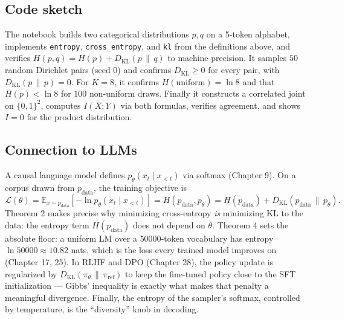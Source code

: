 \subsection*{Code sketch}

The notebook builds two categorical distributions $p, q$ on a 5-token alphabet, implements \texttt{entropy}, \texttt{cross\_entropy}, and \texttt{kl} from the definitions above, and verifies $H(p, q) = H(p) + D_{\mathrm{KL}}(p \,\|\, q)$ to machine precision. It samples $50$ random Dirichlet pairs (seed $0$) and confirms $D_{\mathrm{KL}} \geq 0$ for every pair, with $D_{\mathrm{KL}}(p \,\|\, p) = 0$. For $K = 8$, it confirms $H(\text{uniform}) = \ln 8$ and that $H(p) < \ln 8$ for $100$ non-uniform draws. Finally it constructs a correlated joint on $\{0, 1\}^2$, computes $I(X; Y)$ via both formulas, verifies agreement, and shows $I = 0$ for the product distribution.

\subsection*{Connection to LLMs}

A causal language model defines $p_\theta(x_t \mid x_{<t})$ via softmax (Chapter 9). On a corpus drawn from $p_{\mathrm{data}}$, the training objective is
\[
\mathcal{L}(\theta) = \mathbb{E}_{x \sim p_{\mathrm{data}}}\!\left[-\ln p_\theta(x_t \mid x_{<t})\right] = H(p_{\mathrm{data}}, p_\theta) = H(p_{\mathrm{data}}) + D_{\mathrm{KL}}(p_{\mathrm{data}} \,\|\, p_\theta).
\]
Theorem 2 makes precise why minimizing cross-entropy \emph{is} minimizing KL to the data: the entropy term $H(p_{\mathrm{data}})$ does not depend on $\theta$. Theorem 4 sets the absolute floor: a uniform LM over a $50000$-token vocabulary has entropy $\ln 50000 \approx 10.82$ nats, which is the loss every trained model improves on (Chapter 17, 25). In RLHF and DPO (Chapter 28), the policy update is regularized by $D_{\mathrm{KL}}(\pi_\theta \,\|\, \pi_{\mathrm{ref}})$ to keep the fine-tuned policy close to the SFT initialization --- Gibbs' inequality is exactly what makes that penalty a meaningful divergence. Finally, the entropy of the sampler's softmax, controlled by temperature, is the ``diversity'' knob in decoding.
